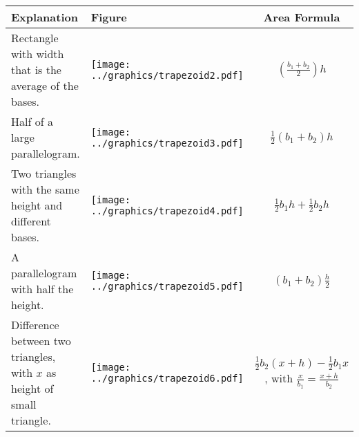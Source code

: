 %
%
\newpage
{\renewcommand{\arraystretch}{1.5}
\begin{tabular}{|>{\centering\arraybackslash}m{2.5cm}|>{\centering\arraybackslash}m{9.5cm}|c|}\hline
Explanation & Figure & Area Formula \\\hline

Rectangle with width that is the average of the bases. & \texttt{[image: ../graphics/trapezoid2.pdf]} & $\left(\frac{b_1+b_2}{2}\right)h$ \\ \hline
Half of a large parallelogram. & \texttt{[image: ../graphics/trapezoid3.pdf]} & $\frac{1}{2}(b_1+b_2)h$ \\ \hline
Two triangles with the same height and different bases. & \texttt{[image: ../graphics/trapezoid4.pdf]} & $\frac{1}{2}b_1h + \frac{1}{2}b_2h$ \\ \hline
A parallelogram with half the height. & \texttt{[image: ../graphics/trapezoid5.pdf]} & $(b_1+b_2)\frac{h}{2}$ \\ \hline
Difference between two triangles, with $x$ as height of small triangle. 
          & \texttt{[image: ../graphics/trapezoid6.pdf]} &  $\frac{1}{2}b_2(x+h)-\frac{1}{2}b_1x$, with $\frac{x}{b_1}=\frac{x+h}{b_2}$ \\ \hline
\end{tabular}}


